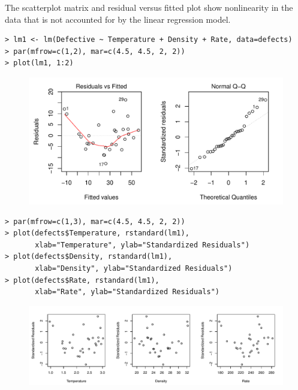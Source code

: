 \documentclass[10pt]{beamer}\usepackage[]{graphicx}\usepackage[]{color}
\begin{document}
\begin{frame}[fragile]
The scatterplot matrix and residual versus fitted plot show nonlinearity in the data that is not accounted for by the linear regression model.
\small
\begin{verbatim}
> lm1 <- lm(Defective ~ Temperature + Density + Rate, data=defects)
> par(mfrow=c(1,2), mar=c(4.5, 4.5, 2, 2))
> plot(lm1, 1:2)
\end{verbatim}
\begin{figure}
\includegraphics[scale=0.5]{figure/defects_resid1.pdf}
\end{figure}
\end{frame}

\begin{frame}[fragile]
\scriptsize
\begin{verbatim}
> par(mfrow=c(1,3), mar=c(4.5, 4.5, 2, 2))
> plot(defects$Temperature, rstandard(lm1), 
       xlab="Temperature", ylab="Standardized Residuals")
> plot(defects$Density, rstandard(lm1), 
       xlab="Density", ylab="Standardized Residuals")
> plot(defects$Rate, rstandard(lm1), 
       xlab="Rate", ylab="Standardized Residuals")
\end{verbatim}
\begin{figure}
\includegraphics[scale=0.55]{figure/defects_resid_x1.pdf}
\end{figure}
\end{frame}
\end{document}
